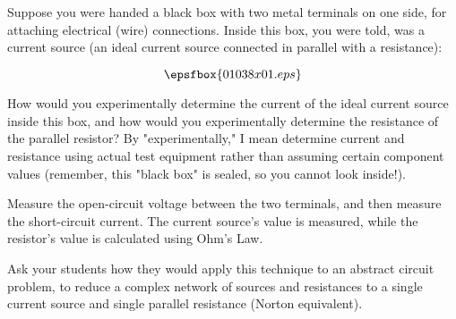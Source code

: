 

Suppose you were handed a black box with two metal terminals on one side, for attaching electrical (wire) connections.  Inside this box, you were told, was a current source (an ideal current source connected in parallel with a resistance):

$$\epsfbox{01038x01.eps}$$

How would you experimentally determine the current of the ideal current source inside this box, and how would you experimentally determine the resistance of the parallel resistor?  By "experimentally," I mean determine current and resistance using actual test equipment rather than assuming certain component values (remember, this "black box" is sealed, so you cannot look inside!).







Measure the open-circuit voltage between the two terminals, and then measure the short-circuit current.  The current source's value is measured, while the resistor's value is calculated using Ohm's Law.







Ask your students how they would apply this technique to an abstract circuit problem, to reduce a complex network of sources and resistances to a single current source and single parallel resistance (Norton equivalent).




